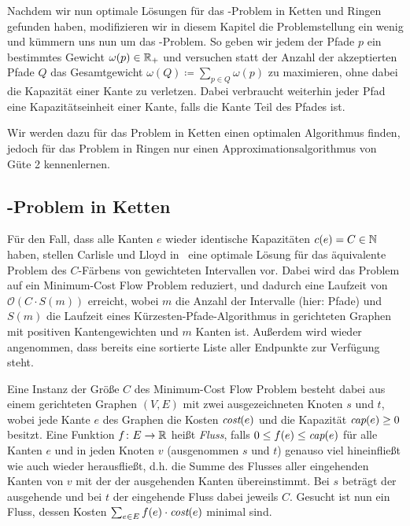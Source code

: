 Nachdem wir nun optimale Lösungen für das \CallControl-Problem in Ketten und Ringen gefunden haben, modifizieren
wir in diesem Kapitel die Problemstellung ein wenig und kümmern uns nun um das \WeightedCallControl-Problem.
So geben wir jedem der Pfade $p$ ein bestimmtes Gewicht $\omega(p) \in \mathbb R_+$ und versuchen statt der
Anzahl der akzeptierten Pfade $Q$ das Gesamtgewicht $\omega(Q) \coloneqq \sum_{p\in Q}\omega(p)$ zu maximieren, ohne
dabei die Kapazität einer Kante zu verletzen.
Dabei verbraucht weiterhin jeder Pfad eine Kapazitätseinheit einer Kante, falls die Kante Teil des Pfades ist.

Wir werden dazu für das Problem in Ketten einen optimalen Algorithmus finden, jedoch für das Problem in Ringen
nur einen Approximationsalgorithmus von Güte 2 kennenlernen.

\subsection{\WeightedCallControl-Problem in Ketten}\label{subsec:weighted-call-control-in-chains}
Für den Fall, dass alle Kanten $e$ wieder identische Kapazitäten $c(e) = C \in \mathbb N$ haben, stellen Carlisle und Lloyd
in~\cite{carlisle} eine optimale Lösung für das äquivalente Problem des $C$-Färbens von gewichteten Intervallen vor.
Dabei wird das Problem auf ein Minimum-Cost Flow Problem reduziert, und dadurch eine Laufzeit von $\mathcal O(C\cdot S(m))$
erreicht, wobei $m$ die Anzahl der Intervalle (hier: Pfade) und $S(m)$ die Laufzeit eines Kürzesten-Pfade-Algorithmus
in gerichteten Graphen mit positiven Kantengewichten und $m$ Kanten ist.
Außerdem wird wieder angenommen, dass bereits eine sortierte Liste aller Endpunkte zur Verfügung steht.

Eine Instanz der Größe $C$ des Minimum-Cost Flow Problem besteht dabei aus einem gerichteten Graphen $(V,E)$ mit zwei
ausgezeichneten Knoten $s$ und $t$, wobei jede Kante $e$ des Graphen die Kosten $\text{\em cost}(e)$ und die Kapazität
$\text{\em cap}(e) \geq 0$ besitzt.
Eine Funktion $f\colon E \rightarrow \mathbb R$ heißt {\em Fluss}, falls $0 \leq f(e) \leq \text{\em cap}(e)$ für alle
Kanten $e$ und in jeden Knoten $v$ (ausgenommen $s$ und $t$) genauso viel hineinfließt wie auch wieder herausfließt, d.h.
die Summe des Flusses aller eingehenden Kanten von $v$ mit der der ausgehenden Kanten übereinstimmt.
Bei $s$ beträgt der ausgehende und bei $t$ der eingehende Fluss dabei jeweils $C$.
Gesucht ist nun ein Fluss, dessen Kosten $\sum_{e\in E}f(e) \cdot \text{\em cost}(e)$ minimal sind.

